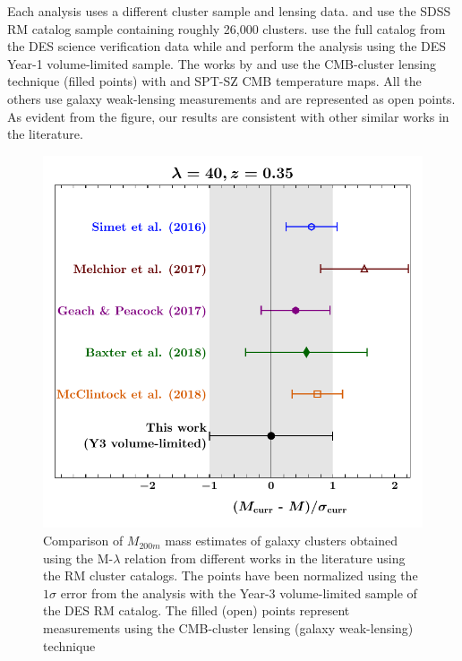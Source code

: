 Each analysis uses a different cluster sample and lensing data.
\citet{simet18} and \citet{geach17} use the SDSS RM catalog sample containing roughly 26,000 clusters. %
\citet{melchoir17} use the full catalog from the DES science verification data while  and  perform the analysis using the DES Year-1 volume-limited sample.
The works by \citet{geach17} and  use the CMB-cluster lensing technique (filled points) with \planck{} and {\sc SPT-SZ} CMB temperature maps.
All the others use galaxy weak-lensing measurements and are represented as open points. As evident from the figure, our results are consistent with other similar works in the literature.

\begin{figure}
\centering
\includegraphics{figs/lit_comparisons_JODY.pdf}
\caption{Comparison of $M_{200m}$ mass estimates of galaxy clusters obtained using the M-$\lambda$ relation from different works in the literature using the RM cluster catalogs. The points have been normalized using the $1\sigma$ error from the analysis with the Year-3 volume-limited sample of the DES RM catalog. The filled (open) points represent measurements using the CMB-cluster lensing (galaxy weak-lensing) technique}
\label{fig_lit_comparison}
\end{figure}
